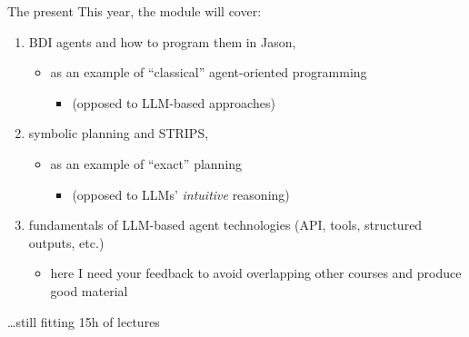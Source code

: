 \documentclass[presentation]{beamer}\mode<presentation>{\usetheme{AMSBolognaFC}}
\begin{document}
\begin{frame}[c]{The present}
This year, the module will cover:
\begin{enumerate}
	\item BDI agents and how to program them in Jason,
	\begin{itemize}
		\item as an example of ``classical'' agent-oriented programming
		\begin{itemize}
			\item (opposed to LLM-based approaches)
		\end{itemize}
	\end{itemize}
	\item symbolic planning and \textsc{STRIPS},
	\begin{itemize}
		\item as an example of ``exact'' planning
		\begin{itemize}
			\item  (opposed to LLMs' \emph{intuitive} reasoning)
		\end{itemize}
	\end{itemize}
	\item fundamentals of LLM-based agent technologies (API, tools, structured outputs, etc.)
	\begin{itemize}
		\item here I need your feedback to avoid overlapping other courses and produce good material
	\end{itemize}
\end{enumerate}
\ldots \alert{still fitting 15h of lectures}
\end{frame}
\end{document}
